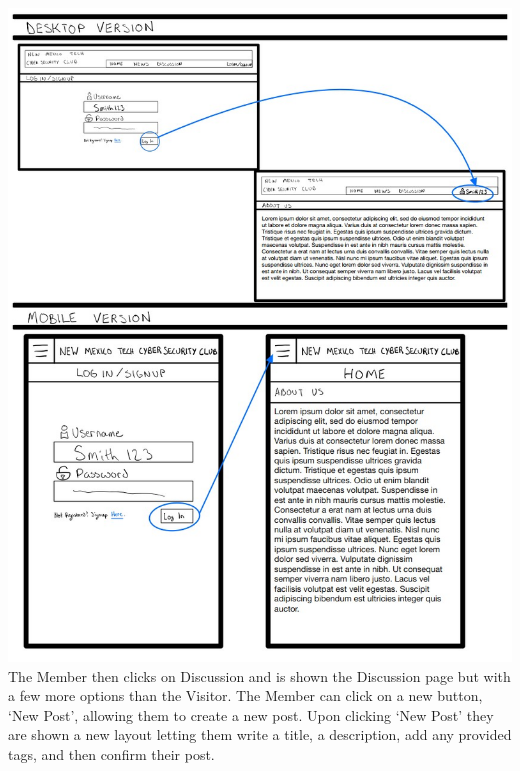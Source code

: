 \documentclass{article}
\begin{document}
\includegraphics[scale=0.60]{member_2.jpg} The Member then clicks on Discussion and is shown the Discussion page but with a few more options than the Visitor.  The Member can click on a new button, ‘New Post’, allowing them to create a new post.  
 Upon clicking ‘New Post’ they are shown a new layout letting them write a title, a description, add any provided tags, and then confirm their post.  
\par
\end{document}
